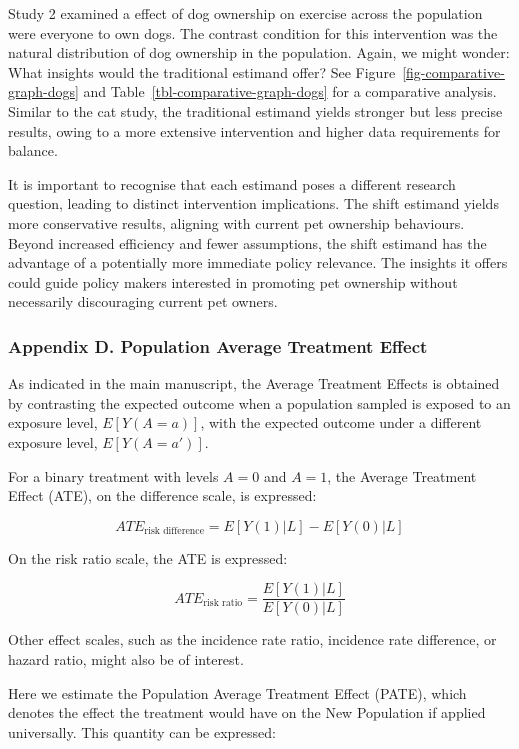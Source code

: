 \documentclass[
  singlecolumn,
  9pt]{article}
\begin{document}
Study 2 examined a effect of dog ownership on exercise across the
population were everyone to own dogs. The contrast condition for this
intervention was the natural distribution of dog ownership in the
population. Again, we might wonder: What insights would the traditional
estimand offer? See Figure~\ref{fig-comparative-graph-dogs} and
Table~\ref{tbl-comparative-graph-dogs} for a comparative analysis.
Similar to the cat study, the traditional estimand yields stronger but
less precise results, owing to a more extensive intervention and higher
data requirements for balance.

It is important to recognise that each estimand poses a different
research question, leading to distinct intervention implications. The
shift estimand yields more conservative results, aligning with current
pet ownership behaviours. Beyond increased efficiency and fewer
assumptions, the shift estimand has the advantage of a potentially more
immediate policy relevance. The insights it offers could guide policy
makers interested in promoting pet ownership without necessarily
discouraging current pet owners.

\newpage{}

\subsubsection{Appendix D. Population Average Treatment
Effect}\label{appendix-d.-population-average-treatment-effect}

As indicated in the main manuscript, the Average Treatment Effects is
obtained by contrasting the expected outcome when a population sampled
is exposed to an exposure level, \(E[Y(A = a)]\), with the expected
outcome under a different exposure level, \(E[Y(A=a')]\).

For a binary treatment with levels \(A=0\) and \(A=1\), the Average
Treatment Effect (ATE), on the difference scale, is expressed:

\[ATE_{\text{risk difference}} = E[Y(1)|L] - E[Y(0)|L]\]

On the risk ratio scale, the ATE is expressed:

\[ATE_{\text{risk ratio}} = \frac{E[Y(1)|L]}{E[Y(0)|L]}\]

Other effect scales, such as the incidence rate ratio, incidence rate
difference, or hazard ratio, might also be of interest.

Here we estimate the Population Average Treatment Effect (PATE), which
denotes the effect the treatment would have on the New Population if
applied universally. This quantity can be expressed:
\end{document}
